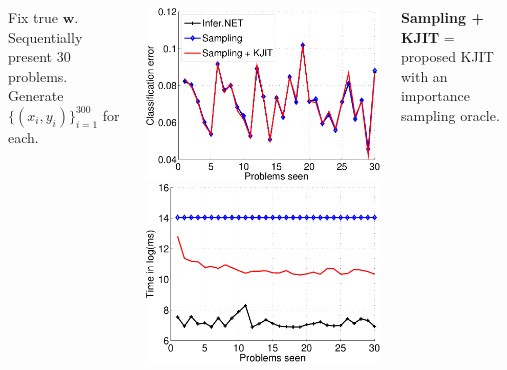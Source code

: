 \documentclass[25pt, a0paper, portrait, margin=0mm, innermargin=10mm,
     blockverticalspace=7mm, colspace=8mm, subcolspace=8mm]{tikzposter} %
\begin{document}
\begin{columns}
{    Fix true $\boldsymbol{w}$. Sequentially present 30 problems. Generate
    $\{(x_i, y_i)\}_{i=1}^{300}$ for each.  
\begin{tikzfigure}
  \centering
  \includegraphics[width=13cm]{online/logistic_01_loss-crop}
  \hspace{3cm}
  \includegraphics[width=13cm]{online/logistic_inference_time-crop}
\end{tikzfigure}

\textbf{Sampling + KJIT} = proposed KJIT with an importance sampling oracle.

}
\end{columns}
\end{document}
